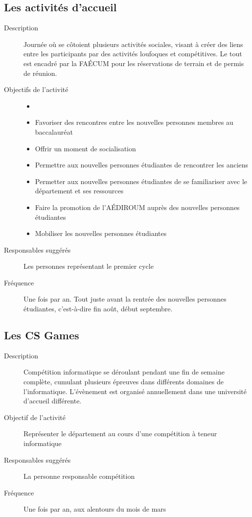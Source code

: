 \documentclass{aediroum}
\begin{document}
\subsection{Les activités d’accueil}
\begin{description}
	\item[Description] Journée où se côtoient plusieurs activités sociales, visant à créer des liens entre les participants par des activités loufoques et compétitives. Le tout est encadré par la FAÉCUM pour les réservations de terrain et de permis de réunion.
	\item[Objectifs de l'activité]
	\begin{itemize}
		\item[]
		\item Favoriser des rencontres entre les nouvelles personnes membres au baccalauréat
		\item Offrir un moment de socialisation
		\item Permettre aux nouvelles personnes étudiantes de rencontrer les anciens
		\item Permetter aux nouvelles personnes étudiantes de se familiariser avec le département et ses ressources
		\item Faire la promotion de l'AÉDIROUM auprès des nouvelles personnes étudiantes
                \item Mobiliser les nouvelles personnes étudiantes
	\end{itemize}
	\item[Responsables suggérés] Les personnes représentant le premier cycle
	\item[Fréquence] Une fois par an. Tout juste avant la rentrée des nouvelles personnes étudiantes, c'est-à-dire fin août, début septembre.
\end{description}

\subsection{Les CS Games}
\begin{description}
	\item[Description] Compétition informatique se déroulant pendant une fin de semaine complète, cumulant plusieurs épreuves dans différents domaines de l'informatique. L'évènement est organisé annuellement dans une université d'accueil différente.
	\item[Objectif de l'activité] Représenter le département au cours d'une compétition à teneur informatique
	\item[Responsables suggérés] La personne responsable compétition
	\item[Fréquence] Une fois par an, aux alentours du mois de mars
\end{description}
\end{document}
